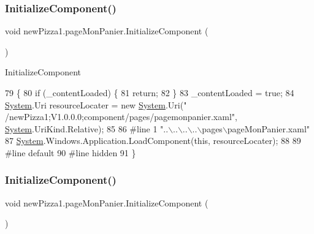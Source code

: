 \subsubsection{\texorpdfstring{Initialize\+Component()}{InitializeComponent()}\hspace{0.1cm}{\footnotesize\ttfamily [1/3]}}
{\footnotesize\ttfamily void new\+Pizza1.\+page\+Mon\+Panier.\+Initialize\+Component (\begin{DoxyParamCaption}{ }\end{DoxyParamCaption})\hspace{0.3cm}{\ttfamily [inline]}}



Initialize\+Component 


\begin{DoxyCode}
79                                           \{
80             \textcolor{keywordflow}{if} (\_contentLoaded) \{
81                 \textcolor{keywordflow}{return};
82             \}
83             \_contentLoaded = \textcolor{keyword}{true};
84             \hyperlink{namespaceSystem}{System}.Uri resourceLocater = \textcolor{keyword}{new} \hyperlink{namespaceSystem}{System}.Uri(\textcolor{stringliteral}{"
      /newPizza1;V1.0.0.0;component/pages/pagemonpanier.xaml"}, \hyperlink{namespaceSystem}{System}.UriKind.Relative);
85             
86 \textcolor{preprocessor}{            #line 1 "..\(\backslash\)..\(\backslash\)..\(\backslash\)..\(\backslash\)pages\(\backslash\)pageMonPanier.xaml"}
87             \hyperlink{namespaceSystem}{System}.Windows.Application.LoadComponent(\textcolor{keyword}{this}, resourceLocater);
88             
89 \textcolor{preprocessor}{            #line default}
90 \textcolor{preprocessor}{            #line hidden}
91         \}
\end{DoxyCode}
\mbox{\label{classnewPizza1_1_1pageMonPanier_af3487726644a638a98b47b824460a5f9}} 
\subsubsection{\texorpdfstring{Initialize\+Component()}{InitializeComponent()}\hspace{0.1cm}{\footnotesize\ttfamily [2/3]}}
{\footnotesize\ttfamily void new\+Pizza1.\+page\+Mon\+Panier.\+Initialize\+Component (\begin{DoxyParamCaption}{ }\end{DoxyParamCaption})\hspace{0.3cm}{\ttfamily [inline]}}



